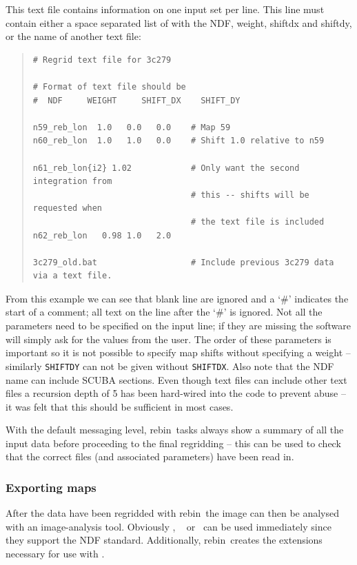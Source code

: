 \documentclass[twoside,11pt]{article}
\newcommand{\Kappa}{\xref{{\sc{Kappa}}}{sun95}{}}
\newcommand{\Figaro}{\xref{{\sc{Figaro}}}{sun86}{}}
\newcommand{\gaia}{\xref{{\sc{Gaia}}}{sun214}{}}
\newcommand{\Iras}{\xref{{\sc{Iras90}}}{sun163}{}}
\newcommand{\task}[1]{{\sf #1}}
\newcommand{\param}[1]{{\tt #1}}
\newcommand{\rebin}{\htmlref{\task{rebin}}{REBIN}}
\newenvironment{myquote}{\begin{quote}\begin{small}}{\end{small}\end{quote}}
\newcommand{\htmlref}[2]{#1}
\newcommand{\xref}[3]{#1}
\renewcommand{\_}{\texttt{\symbol{95}}}
\begin{document}
This text file contains information on one input set per line. This line
must contain either a space separated list of with the NDF, weight, shift\_dx
and shift\_dy, or the name of another text file:

\begin{myquote}
\begin{verbatim}
# Regrid text file for 3c279

# Format of text file should be
#  NDF     WEIGHT     SHIFT_DX    SHIFT_DY

n59_reb_lon  1.0   0.0   0.0    # Map 59
n60_reb_lon  1.0   1.0   0.0    # Shift 1.0 relative to n59

n61_reb_lon{i2} 1.02            # Only want the second integration from
                                # this -- shifts will be requested when
                                # the text file is included
n62_reb_lon   0.98 1.0   2.0    

3c279_old.bat                   # Include previous 3c279 data via a text file.
\end{verbatim}
\end{myquote}

From this example we can see that blank line are ignored and a `\#' indicates
the start of a comment; all text on the line after the `\#' is ignored. Not
all the parameters need to be specified on the input line; if they are missing
the software will simply ask for the values from the user. The order of these
parameters is important so it is not possible to specify map shifts without
specifying a weight -- similarly \param{SHIFT\_DY} can not be given without
\param{SHIFT\_DX}. Also note that the NDF name can include SCUBA sections.
Even though text files can include other text files a recursion depth of 5 has
been hard-wired into the code to prevent abuse -- it was felt that this should
be sufficient in most cases.

With the default messaging level, \rebin\ tasks always show a summary
of all the input data before proceeding to the final regridding -- this
can be used to check that the correct files (and associated parameters) 
have been read in.

\subsubsection{Exporting maps}

After the data have been regridded with \rebin\ the image can then be
analysed with an image-analysis tool. Obviously \Kappa, \Figaro\ \cite{figaro}
or \gaia\ can be used immediately since they support the NDF standard.
Additionally, \rebin\ creates the extensions necessary for use with
\Iras\cite{iras90}.
\end{document}
